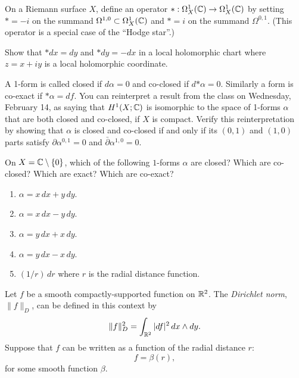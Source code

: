 \documentclass[expanded]{lkx_pset}
\begin{document}
\begin{problem}{3}
On a Riemann surface $X$, define an operator $\mathord{*} :
	\Omega^{1}_{X}(\mathbb{C}) \to \Omega^{1}_{X}(\mathbb{C})$ by setting $\mathord{*}= -i$ on
the summand $\Omega^{1,0}\subset \Omega^{1}_{X}(\mathbb{C})$ and $\mathord{*}=i$ on
the summand $\Omega^{0,1}$. (This operator is a special case of
the ``Hodge star''.)
\end{problem}

\begin{parts}
	\begin{part}{}
		Show that $\mathord{*} dx = dy$ and
		$\mathord{*} dy = -dx$ in a local holomorphic chart where $z=x+iy$
		is a local holomorphic coordinate.
	\end{part}

	\begin{part}{}
		A 1-form is called closed if $d\alpha=0$ and co-closed if $d \mathord{*} \alpha =0$. Similarly a form is co-exact if $*\alpha= df$. You can reinterpret a result from the class on Wednesday,
		February 14, as saying that $H^{1}(X;\mathbb{C})$ is isomorphic to the
		space of 1-forms $\alpha$ that are both closed and co-closed, if $X$ is
		compact. Verify this reinterpretation by showing that $\alpha$ is closed and
		co-closed if and only if its $(0,1)$ and $(1,0)$ parts satisfy $\partial \alpha^{0,1}=0$ and
		$\bar\partial \alpha^{1,0}=0$.
	\end{part}

	\begin{part}{}

		On $X = \mathbb{C}\setminus \{0\}$, which of the following $1$-forms $\alpha$
		are closed? Which are co-closed? Which are exact?
		Which are co-exact?

		\begin{enumerate}
			\item $\alpha=x\, dx + y \, dy$.
			\item $\alpha=x\, dx - y \, dy$.
			\item $\alpha=y\, dx + x \, dy$.
			\item $\alpha=y\, dx - x \, dy$.
			\item $(1/r)\,dr$ where $r$ is the radial distance function.
		\end{enumerate}
	\end{part}
\end{parts}

\begin{problem}{4}
Let $f$ be a smooth compactly-supported function on $\mathbb{R}^{2}$. The
\emph{Dirichlet norm}, $\|f\|_{D}$, can be defined in this context by
\[
	\|f\|_{D}^{2} = \int_{\mathbb{R}^{2}} |df|^{2} \, dx\wedge dy.
\]
Suppose that $f$ can be written as a function of the radial
distance $r$:
\[
	f = \beta(r),
\]
for some smooth function $\beta$.
\end{problem}
\end{document}
